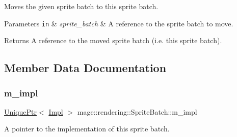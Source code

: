 Moves the given sprite batch to this sprite batch.


\begin{DoxyParams}[1]{Parameters}
\mbox{\tt in}  & {\em sprite\+\_\+batch} & A reference to the sprite batch to move. \\
\hline
\end{DoxyParams}
\begin{DoxyReturn}{Returns}
A reference to the moved sprite batch (i.\+e. this sprite batch). 
\end{DoxyReturn}


\subsection{Member Data Documentation}
\hypertarget{classmage_1_1rendering_1_1_sprite_batch_ae4b2d9d7871bfbd057f1b09036373d75}{}\label{classmage_1_1rendering_1_1_sprite_batch_ae4b2d9d7871bfbd057f1b09036373d75} 
\subsubsection{\texorpdfstring{m\+\_\+impl}{m\_impl}}
{\footnotesize\ttfamily \hyperlink{namespacemage_a3316d7143a973e37adf1110f2e80ca31}{Unique\+Ptr}$<$ \hyperlink{classmage_1_1rendering_1_1_sprite_batch_1_1_impl}{Impl} $>$ mage\+::rendering\+::\+Sprite\+Batch\+::m\+\_\+impl\hspace{0.3cm}{\ttfamily [private]}}

A pointer to the implementation of this sprite batch. 